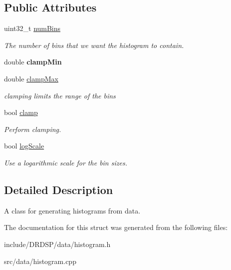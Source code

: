 \subsection*{Public Attributes}
\begin{DoxyCompactItemize}
\item 
\hypertarget{struct_d_r_d_s_p_1_1_histogram_generator_a2f6b01668e743ce436f54c3ca56275a1}{uint32\-\_\-t \hyperlink{struct_d_r_d_s_p_1_1_histogram_generator_a2f6b01668e743ce436f54c3ca56275a1}{num\-Bins}}\label{struct_d_r_d_s_p_1_1_histogram_generator_a2f6b01668e743ce436f54c3ca56275a1}

\begin{DoxyCompactList}\small\item\em The number of bins that we want the histogram to contain. \end{DoxyCompactList}\item 
\hypertarget{struct_d_r_d_s_p_1_1_histogram_generator_aef85198c4644dbcfa27d24e9015bb025}{double {\bfseries clamp\-Min}}\label{struct_d_r_d_s_p_1_1_histogram_generator_aef85198c4644dbcfa27d24e9015bb025}

\item 
\hypertarget{struct_d_r_d_s_p_1_1_histogram_generator_a5cec8e7e75d95a66b4a17c3f70c2b556}{double \hyperlink{struct_d_r_d_s_p_1_1_histogram_generator_a5cec8e7e75d95a66b4a17c3f70c2b556}{clamp\-Max}}\label{struct_d_r_d_s_p_1_1_histogram_generator_a5cec8e7e75d95a66b4a17c3f70c2b556}

\begin{DoxyCompactList}\small\item\em clamping limits the range of the bins \end{DoxyCompactList}\item 
\hypertarget{struct_d_r_d_s_p_1_1_histogram_generator_a12fe0ce6860a6f8bd17b1355f91c0ac6}{bool \hyperlink{struct_d_r_d_s_p_1_1_histogram_generator_a12fe0ce6860a6f8bd17b1355f91c0ac6}{clamp}}\label{struct_d_r_d_s_p_1_1_histogram_generator_a12fe0ce6860a6f8bd17b1355f91c0ac6}

\begin{DoxyCompactList}\small\item\em Perform clamping. \end{DoxyCompactList}\item 
\hypertarget{struct_d_r_d_s_p_1_1_histogram_generator_a84935b50902a985afdeca6541bac8c06}{bool \hyperlink{struct_d_r_d_s_p_1_1_histogram_generator_a84935b50902a985afdeca6541bac8c06}{log\-Scale}}\label{struct_d_r_d_s_p_1_1_histogram_generator_a84935b50902a985afdeca6541bac8c06}

\begin{DoxyCompactList}\small\item\em Use a logarithmic scale for the bin sizes. \end{DoxyCompactList}\end{DoxyCompactItemize}


\subsection{Detailed Description}
A class for generating histograms from data. 

The documentation for this struct was generated from the following files\-:\begin{DoxyCompactItemize}
\item 
include/\-D\-R\-D\-S\-P/data/histogram.\-h\item 
src/data/histogram.\-cpp\end{DoxyCompactItemize}
